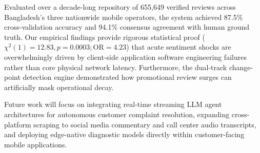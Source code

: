 \documentclass[5p,twocolumn,authoryear]{elsarticle}
\begin{document}
Evaluated over a decade-long repository of 655,649 verified reviews across Bangladesh's three nationwide mobile operators, the system achieved 87.5\% cross-validation accuracy and 94.1\% consensus agreement with human ground truth. Our empirical findings provide rigorous statistical proof ($\chi^2(1) = 12.83, p = 0.0003; \text{OR} = 4.23$) that acute sentiment shocks are overwhelmingly driven by client-side application software engineering failures rather than core physical network latency. Furthermore, the dual-track change-point detection engine demonstrated how promotional review surges can artificially mask operational decay.

Future work will focus on integrating real-time streaming LLM agent architectures for autonomous customer complaint resolution, expanding cross-platform scraping to social media commentary and call center audio transcripts, and deploying edge-native diagnostic models directly within customer-facing mobile applications.



\end{document}
